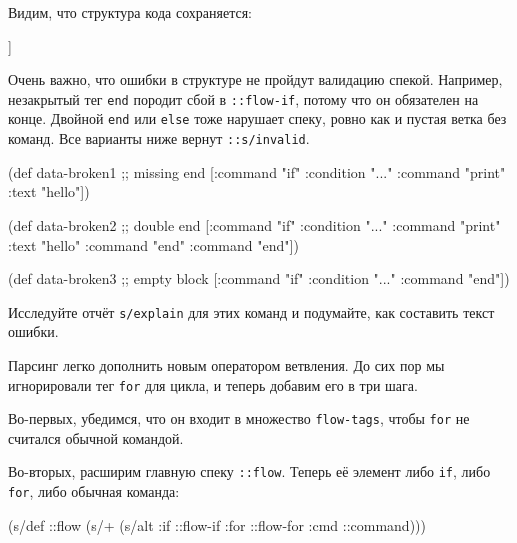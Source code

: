 \noindent
Видим, что структура кода сохраняется:

\begin{english}
  \begin{clojure}
[[:if
  {:this {:command "if" :condition "..."}
   :flow
   [[:if
     {:this {:command "if" :condition "..."}
      :flow [[:cmd {:command "print" :text "hello"}]]
      :end {:command "end"}}]]
   :end {:command "end"}}]]
  \end{clojure}
\end{english}

Очень важно, что ошибки в структуре не пройдут валидацию спекой. Например,
незакрытый тег \texttt{end} породит сбой в \texttt{::flow-if}, потому что он
обязателен на конце. Двойной \texttt{end} или \texttt{else} тоже нарушает спеку,
ровно как и пустая ветка без команд. Все варианты ниже вернут
\texttt{::s/invalid}.

\begin{english}
  \begin{clojure}
(def data-broken1 ;; missing end
  [{:command "if" :condition "..."}
   {:command "print" :text "hello"}])

(def data-broken2 ;; double end
  [{:command "if" :condition "..."}
   {:command "print" :text "hello"}
   {:command "end"}
   {:command "end"}])

(def data-broken3 ;; empty block
  [{:command "if" :condition "..."}
   {:command "end"}])
  \end{clojure}
\end{english}

Исследуйте отчёт \verb|s/explain| для этих команд и подумайте, как составить
текст ошибки.

Парсинг легко дополнить новым оператором ветвления. До сих пор мы игнорировали
тег \verb|for| для цикла, и теперь добавим его в три шага.

Во-первых, убедимся, что он входит в множество \texttt{flow-tags}, чтобы
\verb|for| не считался обычной командой.

Во-вторых, расширим главную спеку \texttt{::flow}. Теперь её элемент либо
\texttt{if}, либо \texttt{for}, либо обычная команда:

\begin{english}
  \begin{clojure}
(s/def ::flow
  (s/+
   (s/alt :if ::flow-if
          :for ::flow-for
          :cmd ::command)))
  \end{clojure}
\end{english}

